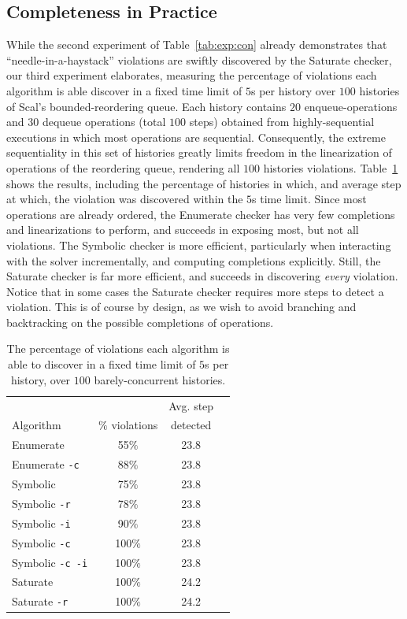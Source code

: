 \subsection{Completeness in Practice}
\label{sec:exp:complete}

While the second experiment of Table~\ref{tab:exp:con} already demonstrates
that ``needle-in-a-haystack'' violations are swiftly discovered by the {\sc
Saturate} checker, our third experiment elaborates, measuring the percentage of
violations each algorithm is able discover in a fixed time limit of $5$s per
history over $100$ histories of Scal's bounded-reordering queue. Each history
contains $20$ {\sf enqueue}-operations and $30$ {\sf dequeue} operations (total
$100$ steps) obtained from highly-sequential executions in which most
operations are sequential. Consequently, the extreme sequentiality in this set
of histories greatly limits freedom in the linearization of operations of the
reordering queue, rendering all $100$ histories violations.
Table~\ref{tab:exp:seq} shows the results, including the percentage of
histories in which, and average step at which, the violation was discovered
within the $5$s time limit. Since most operations are already ordered, the {\sc
Enumerate} checker has very few completions and linearizations to perform, and
succeeds in exposing most, but not all violations. The {\sc Symbolic} checker
is more efficient, particularly when interacting with the solver incrementally,
and computing completions explicitly. Still, the {\sc Saturate} checker is far
more efficient, and succeeds in discovering \emph{every} violation. Notice that
in some cases the {\sc Saturate} checker requires more steps to detect a
violation. This is of course by design, as we wish to avoid branching and
backtracking on the possible completions of operations.

\begin{table}[t]
  \footnotesize
  \centering
  \setlength{\tabcolsep}{1.8mm}
  \begin{tabular}{lccc}
   	          & 	              & Avg. step \\
    Algorithm & $\%$ violations & detected  \\
    \hline
    {\sc Enumerate}             & 55$\%$  & 23.8 \\
    {\sc Enumerate} {\tt -c}    & 88$\%$  & 23.8 \\
    {\sc Symbolic}              & 75$\%$  & 23.8 \\
    {\sc Symbolic} {\tt -r}     & 78$\%$  & 23.8 \\
    {\sc Symbolic} {\tt -i}     & 90$\%$  & 23.8 \\
    {\sc Symbolic} {\tt -c}     & 100$\%$ & 23.8 \\
    {\sc Symbolic} {\tt -c -i}  & 100$\%$ & 23.8 \\
    {\sc Saturate}              & 100$\%$ & 24.2 \\
    {\sc Saturate} {\tt -r}     & 100$\%$ & 24.2
  \end{tabular} 

  \caption{The percentage of violations each algorithm is able to discover in a
  fixed time limit of $5$s per history, over $100$ barely-concurrent histories.}
  \label{tab:exp:seq}
\end{table}
